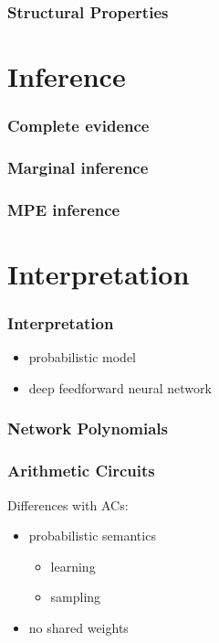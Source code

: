 \documentclass[xcolor={usenames,dvipsnames,svgnames}, compress]{beamer}
\begin{document}
\begin{frame}
  \frametitle{Structural Properties}
\end{frame}

\section{Inference}
{
  \begin{frame}
    \sectionpage
  \end{frame}
}

\begin{frame}
  \frametitle{Complete evidence}
\end{frame}

\begin{frame}
  \frametitle{Marginal inference}
\end{frame}

\begin{frame}
  \frametitle{MPE inference}
\end{frame}


\section{Interpretation}
{
  \begin{frame}
    \sectionpage
  \end{frame}
}

\begin{frame}
\frametitle{Interpretation}
\begin{itemize}
\item probabilistic model
\item deep feedforward neural network
\end{itemize}
\end{frame}


\begin{frame}
\frametitle{Network Polynomials}
\end{frame}

\begin{frame}
  \frametitle{Arithmetic Circuits}
  Differences with ACs:
  \begin{itemize}
  \item probabilistic semantics
    \begin{itemize}
    \item learning
      \item sampling
    \end{itemize}
    \item no shared weights
  \end{itemize}
\end{frame}
\end{document}
